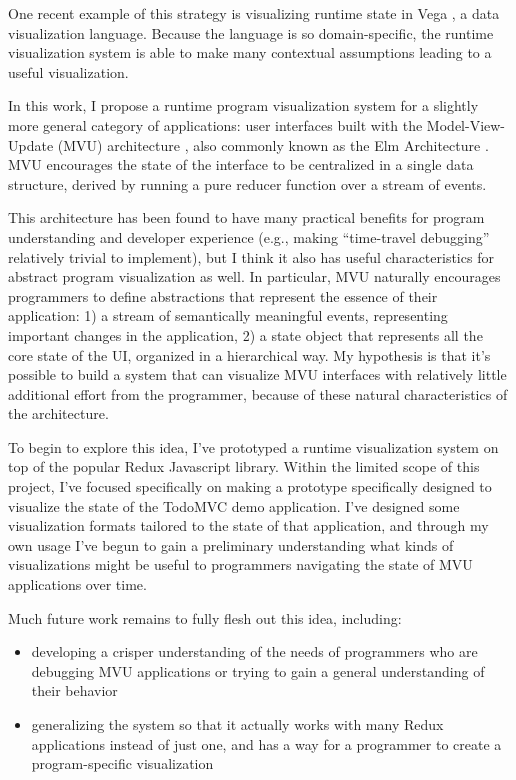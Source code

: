 \documentclass{sigchi}
\providecommand{\tightlist}{%
  \setlength{\itemsep}{0pt}\setlength{\parskip}{0pt}}
\begin{document}
One recent example of this strategy is visualizing runtime state in Vega
\autocite{hoffswell2018a}, a data visualization language. Because the
language is so domain-specific, the runtime visualization system is able
to make many contextual assumptions leading to a useful visualization.

In this work, I propose a runtime program visualization system for a
slightly more general category of applications: user interfaces built
with the Model-View-Update (MVU) architecture \autocite{fowler2020},
also commonly known as the Elm Architecture \autocite{czaplicki}. MVU
encourages the state of the interface to be centralized in a single data
structure, derived by running a pure reducer function over a stream of
events.

This architecture has been found to have many practical benefits for
program understanding and developer experience (e.g., making
``time-travel debugging'' relatively trivial to implement), but I think
it also has useful characteristics for abstract program visualization as
well. In particular, MVU naturally encourages programmers to define
abstractions that represent the essence of their application: 1) a
stream of semantically meaningful events, representing important changes
in the application, 2) a state object that represents all the core state
of the UI, organized in a hierarchical way. My hypothesis is that it's
possible to build a system that can visualize MVU interfaces with
relatively little additional effort from the programmer, because of
these natural characteristics of the architecture.

To begin to explore this idea, I've prototyped a runtime visualization
system on top of the popular Redux \autocite{zotero-621} Javascript
library. Within the limited scope of this project, I've focused
specifically on making a prototype specifically designed to visualize
the state of the TodoMVC demo application. I've designed some
visualization formats tailored to the state of that application, and
through my own usage I've begun to gain a preliminary understanding what
kinds of visualizations might be useful to programmers navigating the
state of MVU applications over time.

Much future work remains to fully flesh out this idea, including:

\begin{itemize}
\tightlist
\item
  developing a crisper understanding of the needs of programmers who are
  debugging MVU applications or trying to gain a general understanding
  of their behavior
\item
  generalizing the system so that it actually works with many Redux
  applications instead of just one, and has a way for a programmer to
  create a program-specific visualization
\end{itemize}
\end{document}
